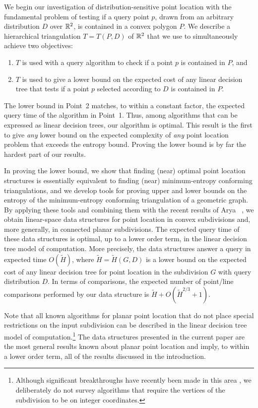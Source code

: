 \documentclass[charterfonts,lotsofwhite]{patmorin}
\begin{document}
We begin our investigation of distribution-sensitive point location
with the fundamental problem of testing if a query point $p$, drawn
from an arbitrary distribution $D$ over $\mathbb{R}^2$, is contained in a
convex polygon $P$.  We describe a hierarchical triangulation
$T=T(P,D)$ of $\mathbb{R}^2$ that we use to simultaneously achieve two
objectives:
\begin{enumerate}
\item $T$ is used with a query algorithm to check if a point $p$ 
	is contained in $P$, and
\item $T$ is used to give a lower bound on the expected cost of
	any linear decision tree that tests if a point $p$ selected
	according to $D$ is contained in $P$.
\end{enumerate}
The lower bound in Point~2 matches, to within a constant factor, the
expected query time of the algorithm in Point~1.  Thus, among
algorithms that can be expressed as linear decision trees, our
algorithm is optimal. This result is the first to give
\emph{any} lower bound on the expected complexity of \emph{any} point
location problem that exceeds the entropy bound. Proving the lower
bound is by far the hardest part of our results.  

In proving the lower bound, we show that finding (near) optimal point
location structures is essentially equivalent to finding (near)
minimum-entropy conforming triangulations, and we develop tools for
proving upper and lower bounds on the entropy of the minimum-entropy
conforming triangulation of a geometric graph.  By applying these
tools and combining them with the recent results of Arya \etal\
\cite{ammw07}, we obtain linear-space data structures for point
location in convex subdivisions and, more generally, in connected
planar subdivisions.  The expected query time of these data structures
is optimal, up to a lower order term, in the linear decision tree
model of computation.  More precisely, the data structures answer a query
in expected time $O(\tilde H)$, where $\tilde H=\tilde H(G,D)$ is a
lower bound on the expected cost of any linear decision tree for point
location in the subdivision $G$ with query distribution $D$.  In terms
of comparisons, the expected number of point/line comparisons
performed by our data structure is $\tilde H + O(\tilde H^{2/3}+1)$.

Note that all known algorithms for planar point location that do not
place special restrictions on the input subdivision can be described
in the linear decision tree model of computation.\footnote{Although
significant breakthroughs have recently been made in this area
\cite{c06,p06}, we deliberately do not survey algorithms that require
the vertices of the subdivision to be on integer coordinates.}  The
data structures presented in the current paper are the most general
results known about planar point location and imply, to within a
lower order term, all of the results discussed in the introduction.
\end{document}
